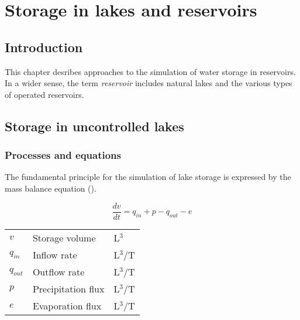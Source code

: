 \chapter{Storage in lakes and reservoirs} \label{chap:resStor}
\renewcommand{\tabdir}{chapters/part_processes/reservoirStorage/tab}
\renewcommand{\figdir}{chapters/part_processes/reservoirStorage/fig}

\section{Introduction} \label{sec:resStor_intro}

This chapter desribes approaches to the simulation of water storage in reservoirs. In a wider sense, the term \emph{reservoir} includes natural lakes and the various types of operated reservoirs.


\section{Storage in uncontrolled lakes} \label{sec:resStor_lake}


\subsection{Processes and equations} \label{sec:resStor_lake_processes}

The fundamental principle for the simulation of lake storage is expressed by the mass balance equation ().

\begin{equation} \label{eqn:resStor_lake_massBalancePure}
  \frac{dv}{dt} = q_{in} + p - q_{out} - e
\end{equation}

\begin{tabular}{lll}
  $v$ & Storage volume & L$^3$ \\
  $q_{in}$ & Inflow rate & L$^3$/T \\
  $q_{out}$ & Outflow rate & L$^3$/T \\
  $p$ & Precipitation flux & L$^3$/T \\
  $e$ & Evaporation flux & L$^3$/T \\
\end{tabular}

